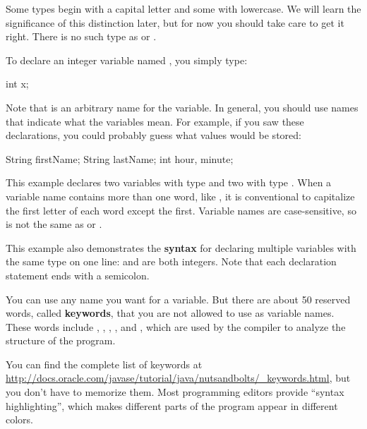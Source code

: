 Some types begin with a capital letter and some with lowercase.
We will learn the significance of this distinction later, but for now you should take care to get it right.
There is no such type as  or .

To declare an integer variable named , you simply type:

\begin{code}
int x;
\end{code}

Note that  is an arbitrary name for the variable.
In general, you should use names that indicate what the variables mean.
For example, if you saw these declarations, you could probably guess what values would be stored:

\begin{code}
String firstName;
String lastName;
int hour, minute;
\end{code}


This example declares two variables with type  and two with type .
When a variable name contains more than one word, like , it is conventional to capitalize the first letter of each word except the first.
Variable names are case-sensitive, so  is not the same as  or .


This example also demonstrates the {\bf syntax} for declaring multiple variables with the same type on one line:  and  are both integers.
Note that each declaration statement ends with a semicolon.


You can use any name you want for a variable.
But there are about 50 reserved words, called {\bf keywords}, that you are not allowed to use as variable names.
These words include , , , , and , which are used by the compiler to analyze the structure of the program.

You can find the complete list of keywords at \url{http://docs.oracle.com/javase/tutorial/java/nutsandbolts/_keywords.html}, but you don't have to memorize them.
Most programming editors provide ``syntax highlighting'', which makes different parts of the program appear in different colors.


